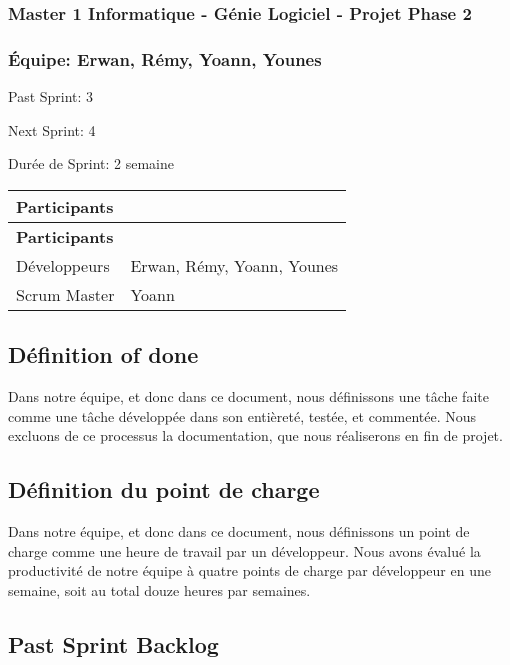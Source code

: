 \subsubsection*{Master 1 Informatique -\/ Génie Logiciel -\/ Projet Phase 2}

\subsubsection*{Équipe\+: Erwan, Rémy, Yoann, Younes}


\begin{DoxyItemize}
\item Past Sprint\+: 3
\item Next Sprint\+: 4
\item Durée de Sprint\+: 2 semaine
\end{DoxyItemize}

\tabulinesep=1mm
\begin{longtabu} spread 0pt [c]{*{2}{|X[-1]}|}
\hline
\rowcolor{\tableheadbgcolor}\textbf{ Participants }&\textbf{ }\\
\endfirsthead
\hline
\endfoot
\hline
\rowcolor{\tableheadbgcolor}\textbf{ Participants }&\textbf{ }\\
\endhead
Développeurs &Erwan, Rémy, Yoann, Younes \\
Scrum Master &Yoann \\
\end{longtabu}
\subsection*{Définition of done}

Dans notre équipe, et donc dans ce document, nous définissons une tâche faite comme une tâche développée dans son entièreté, testée, et commentée. Nous excluons de ce processus la documentation, que nous réaliserons en fin de projet.

\subsection*{Définition du point de charge}

Dans notre équipe, et donc dans ce document, nous définissons un point de charge comme une heure de travail par un développeur. Nous avons évalué la productivité de notre équipe à quatre points de charge par développeur en une semaine, soit au total douze heures par semaines.

\subsection*{Past Sprint Backlog}

